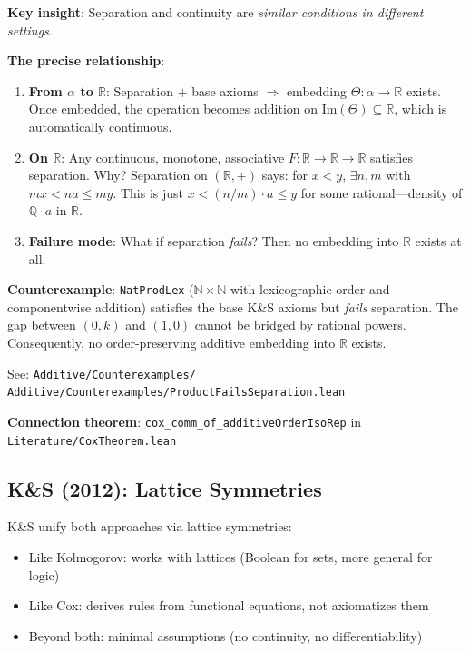 \documentclass[11pt]{article}
\theoremstyle{definition}
\theoremstyle{remark}
\begin{document}
\textbf{Key insight}: Separation and continuity are \emph{similar conditions in different settings}.

\textbf{The precise relationship}:
\begin{enumerate}
\item \textbf{From $\alpha$ to $\mathbb{R}$}: Separation + base axioms $\Rightarrow$ embedding $\Theta : \alpha \to \mathbb{R}$ exists.
  Once embedded, the operation becomes addition on $\mathrm{Im}(\Theta) \subseteq \mathbb{R}$, which is automatically continuous.

\item \textbf{On $\mathbb{R}$}: Any continuous, monotone, associative $F : \mathbb{R} \to \mathbb{R} \to \mathbb{R}$ satisfies separation.
  Why? Separation on $(\mathbb{R}, +)$ says: for $x < y$, $\exists n,m$ with $mx < na \leq my$.
  This is just $x < (n/m) \cdot a \leq y$ for some rational---density of $\mathbb{Q} \cdot a$ in $\mathbb{R}$.

\item \textbf{Failure mode}: What if separation \emph{fails}? Then no embedding into $\mathbb{R}$ exists at all.
\end{enumerate}

\textbf{Counterexample}: \texttt{NatProdLex} ($\mathbb{N} \times \mathbb{N}$ with lexicographic order and componentwise addition) satisfies the base K\&S axioms but \emph{fails} separation.
The gap between $(0, k)$ and $(1, 0)$ cannot be bridged by rational powers.
Consequently, no order-preserving additive embedding into $\mathbb{R}$ exists.

See: \texttt{Additive/Counterexamples/} \\
\hspace*{2em} \texttt{Additive/Counterexamples/ProductFailsSeparation.lean}

\textbf{Connection theorem}: \texttt{cox\_comm\_of\_additiveOrderIsoRep} in \\
\hspace*{2em} \texttt{Literature/CoxTheorem.lean}

\subsection{K\&S (2012): Lattice Symmetries}

K\&S unify both approaches via lattice symmetries:
\begin{itemize}
\item Like Kolmogorov: works with lattices (Boolean for sets, more general for logic)
\item Like Cox: derives rules from functional equations, not axiomatizes them
\item Beyond both: minimal assumptions (no continuity, no differentiability)
\end{itemize}
\end{document}
